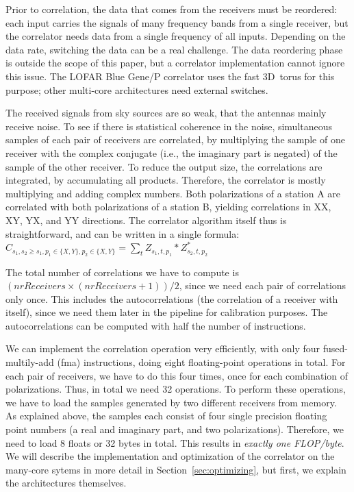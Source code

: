 \documentclass{article}
\begin{document}
Prior to correlation, the data that comes from
the receivers must be reordered:
each input carries the signals of many frequency bands from a single
receiver, but the correlator needs data from a single frequency of all inputs.
Depending on the data rate, switching the data can be a real challenge.
The data reordering phase is outside the scope of this paper, but a correlator
implementation cannot ignore this issue.
The LOFAR Blue Gene/P correlator uses the fast 3D~torus for this purpose;
other multi-core architectures need external switches.

The received signals from sky sources are so weak, that the antennas 
mainly receive noise. To see if there is statistical coherence
in the noise, simultaneous samples of each pair of receivers are correlated, 
by multiplying the sample of one receiver with the complex
conjugate (i.e., the imaginary part is negated) of the sample of the other receiver.
To reduce the output size, the correlations are integrated, by accumulating all products. 
Therefore, the correlator is mostly multiplying and adding complex numbers.
Both polarizations of a station A are correlated with both polarizations 
of a station B, yielding correlations in XX, XY, YX, and YY
directions.
The correlator algorithm itself thus is straightforward, and can be
written in a single formula: \\
$C_{s_1,s_2\geq s_1,p_1\in\{X,Y\},p_2\in\{X,Y\}} = \displaystyle\sum_{t} Z_{s_1,t,p_1} * Z_{s_2,t,p_2}^\ast$ 

The total number of correlations we have to compute is $(nrReceivers \times
(nrReceivers + 1)) / 2$, since we need each pair of correlations only
once. This includes the autocorrelations (the correlation of a receiver with itself),
since we need them later in the pipeline for calibration purposes.
The autocorrelations can be computed with half the number of instructions.

We can implement the correlation operation very efficiently, with only
four fused-multily-add (fma) instructions, doing eight floating-point
operations in total. For each pair of receivers, we have to do this
four times, once for each combination of polarizations. Thus, in total
we need 32 operations. To perform these operations, we have to load
the samples generated by two different receivers from memory.  As
explained above, the samples each consist of four single precision
floating point numbers (a real and imaginary part, and two
polarizations).  Therefore, we need to load 8 floats or 32 bytes in
total.  This results in \emph{exactly one FLOP/byte}. 
We will describe the implementation and optimization of the correlator on the
many-core sytems in more detail in Section~\ref{sec:optimizing}, but first, we explain the architectures themselves. 
\end{document}
